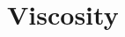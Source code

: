 \documentclass[9pt,bestpractices]{livecoms}
\begin{document}





\section{Viscosity} \label{sec:Viscosity}

\end{document}

